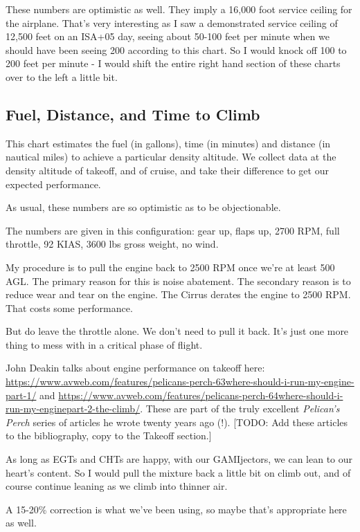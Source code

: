 These numbers are optimistic as well. They imply a 16,000 foot service ceiling for the airplane. That's very interesting as I saw a demonstrated service ceiling of 12,500 feet on an ISA+05 day, seeing about 50-100 feet per minute when we should have been seeing 200 according to this chart. So I would knock off 100 to 200 feet per minute - I would shift the entire right hand section of these charts over to the left a little bit.

\subsection{Fuel, Distance, and Time to Climb}

This chart estimates the fuel (in gallons), time (in minutes) and distance (in nautical miles) to achieve a particular density altitude. We collect data at the density altitude of takeoff, and of cruise, and take their difference to get our expected performance.

As usual, these numbers are so optimistic as to be objectionable.

The numbers are given in this configuration: gear up, flaps up, 2700 RPM, full throttle, 92 KIAS, 3600 lbs gross weight, no wind.

My procedure is to pull the engine back to 2500 RPM once we're at least 500 AGL. The primary reason for this is noise abatement. The secondary reason is to reduce wear and tear on the engine. The Cirrus derates the engine to 2500 RPM. That costs some performance.

But do leave the throttle alone. We don't need to pull it back. It's just one more thing to mess with in a critical phase of flight.

John Deakin talks about engine performance on takeoff here: \url{https://www.avweb.com/features/pelicans-perch-63where-should-i-run-my-engine-part-1/} and \url{https://www.avweb.com/features/pelicans-perch-64where-should-i-run-my-enginepart-2-the-climb/}. These are part of the truly excellent \emph{Pelican's Perch} series of articles he wrote twenty years ago (!). [TODO: Add these articles to the bibliography, copy to the Takeoff section.]

As long as EGTs and CHTs are happy, with our GAMIjectors, we can lean to our heart's content. So I would pull the mixture back a little bit on climb out, and of course continue leaning as we climb into thinner air.

A 15-20\% correction is what we've been using, so maybe that's appropriate here as well.

